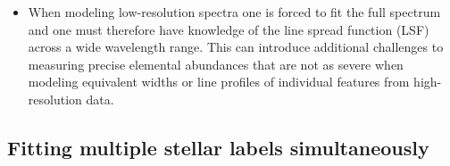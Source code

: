 \documentclass[iop]{emulateapj}
\begin{document}
\begin{CJK*}{UTF8}{gbsn}
\begin{itemize}
\item When modeling low-resolution spectra one is forced to fit the full spectrum and one must therefore have knowledge of the line spread function (LSF) across a wide wavelength range. This can introduce additional challenges to measuring precise elemental abundances that are not as severe when modeling equivalent widths or line profiles of individual features from high-resolution data.
\end{itemize}



%
%
%
%
%
%

\subsection{Fitting multiple stellar labels simultaneously}
\label{sec:psm}


\end{CJK*}
\end{document}
